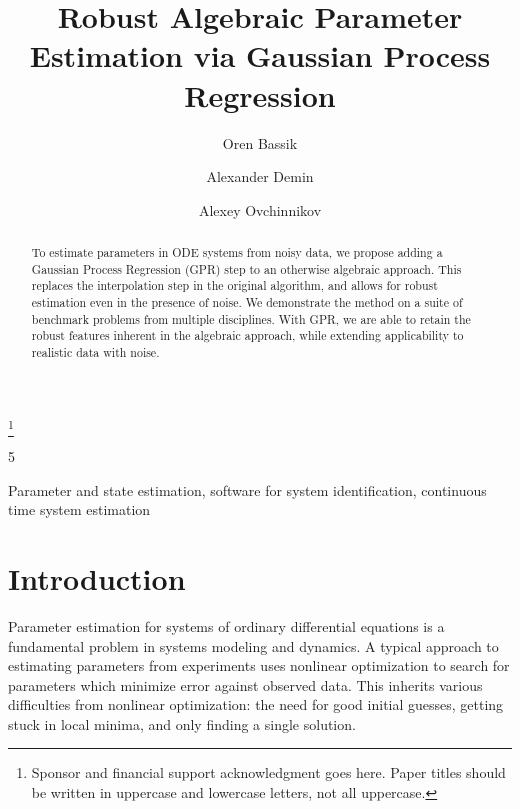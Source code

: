 \documentclass{ifacconf}
\begin{document}
	\begin{frontmatter}
		
		\title{Robust Algebraic Parameter Estimation via Gaussian Process Regression} 
		
		\thanks[footnoteinfo]{Sponsor and financial support acknowledgment
			goes here. Paper titles should be written in uppercase and lowercase
			letters, not all uppercase.}
		
		\author[First]{Oren Bassik}5 
		\author[Second]{Alexander Demin} 
		\author[Third]{Alexey Ovchinnikov}
		
\address[First]{Graduate Center, City University of New York, 
	365 Fifth Avenue, New York, NY 10016, USA (e-mail: obassik@gradcenter.cuny.edu).}
\address[Second]{Higher School of Economics, 
	National Research University, Moscow, Russia (e-mail: asdemin_2@edu.hse.ru).}
\address[Third]{Department of Mathematics, 
	Queens College, City University of New York, 
	65-30 Kissena Blvd, Queens, NY 11367, USA (e-mail: aovchinnikov@qc.cuny.edu).}
		
		\begin{abstract}                %
			To estimate parameters in ODE systems from noisy data, we propose adding a Gaussian Process Regression (GPR) step to an otherwise algebraic approach.  This replaces the interpolation step in the original algorithm, and allows for robust estimation even in the presence of noise.  We demonstrate the method on a suite of benchmark problems from multiple disciplines.  With GPR, we are able to retain the robust features inherent in the algebraic approach, while extending applicability to realistic data with noise.
		\end{abstract}
		
		\begin{keyword}
			Parameter and state estimation, software for system identification, continuous time system estimation
		\end{keyword}
		
	\end{frontmatter}
	
	\section{Introduction}
	Parameter estimation for systems of ordinary differential equations is a fundamental problem in systems modeling and dynamics.  A typical approach to estimating parameters from experiments uses nonlinear optimization to search for parameters which minimize error against observed data.  This inherits various difficulties from nonlinear optimization: the need for good initial guesses, getting stuck in local minima, and only finding a single solution.  
	
\end{document}
